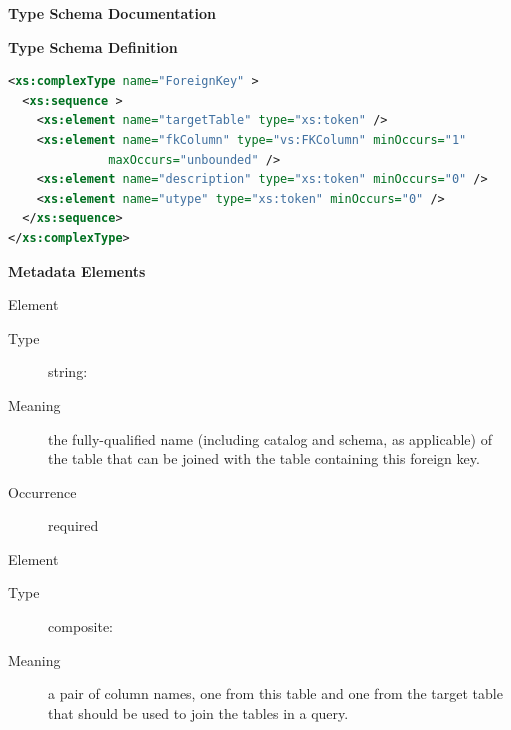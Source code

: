 \documentclass[11pt,a4paper]{ivoa}
\begin{document}
\begin{generated}
\begingroup
      	\renewcommand*\descriptionlabel[1]{%
      	\hbox to 5.5em{\emph{#1}\hfil}}\vspace{2ex}\noindent\textbf{ Type Schema Documentation}



\vspace{1ex}\noindent\textbf{ Type Schema Definition}

\begin{lstlisting}[language=XML,basicstyle=\footnotesize]
<xs:complexType name="ForeignKey" >
  <xs:sequence >
    <xs:element name="targetTable" type="xs:token" />
    <xs:element name="fkColumn" type="vs:FKColumn" minOccurs="1"
              maxOccurs="unbounded" />
    <xs:element name="description" type="xs:token" minOccurs="0" />
    <xs:element name="utype" type="xs:token" minOccurs="0" />
  </xs:sequence>
</xs:complexType>
\end{lstlisting}

\vspace{0.5ex}\noindent\textbf{ Metadata Elements}

\begingroup\small\begin{bigdescription}\item[Element \xmlel{targetTable}]
\begin{description}
\item[Type] string: 
\item[Meaning] 
               the fully-qualified name (including catalog and schema, as
               applicable) of the table that can be joined with the 
               table containing this foreign key.
             
\item[Occurrence] required

\end{description}
\item[Element \xmlel{fkColumn}]
\begin{description}
\item[Type] composite: 
\item[Meaning] 
               a pair of column names, one from this table and one
               from the target table that should be used to join the
               tables in a query.  
             

\end{description}
\end{bigdescription}
\end{generated}
\end{document}

